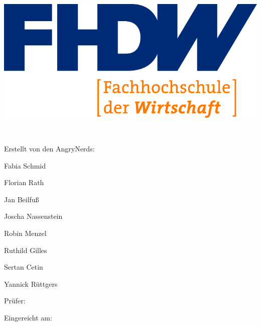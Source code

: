 
\begin{titlepage}

\begin{center}


\includegraphics[scale=1.20]{img/fhdw}\\

\vspace{.05cm}

\Huge{\bfseries\dokumententyp}


\LARGE{\dokumententitel}

~\vspace{.05cm}\\

\large{

Erstellt von den AngryNerds:\\\vspace{1mm}

Fabia Schmid

Florian Rath

Jan Beilfuß

Joscha Nassenstein

Robin Menzel

Ruthild Gilles

Sertan Cetin

Yannick Rüttgers


\vspace{.5cm}

Prüfer:\vspace{1mm}\\

\dokumentenpruefer


\vspace{.5cm}

Eingereicht am:\vspace{1mm}\\

\abgabedatum

}

\end{center}


\end{titlepage}

